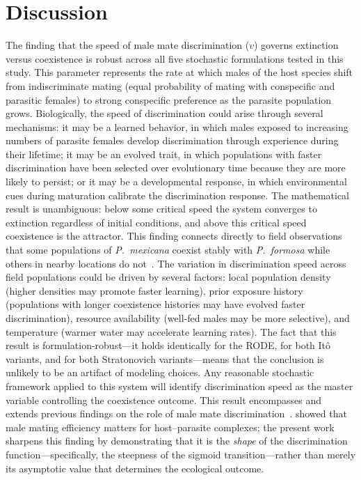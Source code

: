 \documentclass[12pt]{article}
\begin{document}
\section{Discussion}\label{sec:discussion}
The finding that the speed of male mate discrimination ($v$) governs extinction versus coexistence is robust across all five stochastic formulations tested in this study.  This parameter represents the rate at which males of the host species shift from indiscriminate mating (equal probability of mating with conspecific and parasitic females) to strong conspecific preference as the parasite population grows.  Biologically, the speed of discrimination could arise through several mechanisms: it may be a learned behavior, in which males exposed to increasing numbers of parasite females develop discrimination through experience during their lifetime; it may be an evolved trait, in which populations with faster discrimination have been selected over evolutionary time because they are more likely to persist; or it may be a developmental response, in which environmental cues during maturation calibrate the discrimination response.  The mathematical result is unambiguous: below some critical speed the system converges to extinction regardless of initial conditions, and above this critical speed coexistence is the attractor.  This finding connects directly to field observations that some populations of \textit{P.~mexicana} coexist stably with \textit{P.~formosa} while others in nearby locations do not~\citep{Balsano1989}.  The variation in discrimination speed across field populations could be driven by several factors: local population density (higher densities may promote faster learning), prior exposure history (populations with longer coexistence histories may have evolved faster discrimination), resource availability (well-fed males may be more selective), and temperature (warmer water may accelerate learning rates).  The fact that this result is formulation-robust---it holds identically for the RODE, for both It\^{o} variants, and for both Stratonovich variants---means that the conclusion is unlikely to be an artifact of modeling choices.  Any reasonable stochastic framework applied to this system will identify discrimination speed as the master variable controlling the coexistence outcome.  This result encompasses and extends previous findings on the role of male mate discrimination~\citep{Kokko2008, Balsano1989, Kiester1981, Heubel2009}.  \citet{Heubel2009} showed that male mating efficiency matters for host--parasite complexes; the present work sharpens this finding by demonstrating that it is the \emph{shape} of the discrimination function---specifically, the steepness of the sigmoid transition---rather than merely its asymptotic value that determines the ecological outcome.
\end{document}

